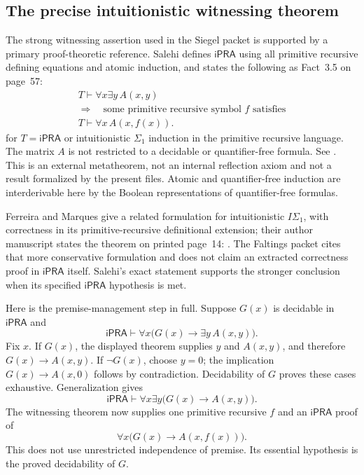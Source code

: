 \subsection{The precise intuitionistic witnessing theorem}

The strong witnessing assertion used in the Siegel packet is supported
by a primary proof-theoretic reference. Salehi defines $\mathsf{iPRA}$
using all primitive recursive defining equations and atomic induction,
and states the following as Fact~3.5 on page~57:
\[
 \begin{gathered}
 T\vdash\forall x\exists y\,A(x,y)\\
 \Longrightarrow\quad
 \text{some primitive recursive symbol }f\text{ satisfies}\\
 T\vdash\forall x\,A(x,f(x)).
 \end{gathered}
\]
for $T=\mathsf{iPRA}$ or intuitionistic $\Sigma_1$ induction in the
primitive recursive language. The matrix $A$ is not restricted to a
decidable or quantifier-free formula. See \cite{salehi}.
This is an external metatheorem, not an internal reflection axiom and
not a result formalized by the present files. Atomic and quantifier-free
induction are interderivable here by the Boolean representations of
quantifier-free formulas.

Ferreira and Marques give a related formulation for intuitionistic
$I\Sigma_1$, with correctness in its primitive-recursive definitional
extension; their author manuscript states the theorem on printed
page~14:
\cite{ferreira}.
The Faltings packet cites that more conservative formulation and does
not claim an extracted correctness proof in $\mathsf{iPRA}$ itself.
Salehi's exact statement supports the stronger conclusion when its
specified $\mathsf{iPRA}$ hypothesis is met.

Here is the premise-management step in full. Suppose $G(x)$ is decidable
in $\mathsf{iPRA}$ and
\[
 \mathsf{iPRA}\vdash
 \forall x\bigl(G(x)\longrightarrow\exists y\,A(x,y)\bigr).
\]
Fix $x$. If $G(x)$, the displayed theorem supplies $y$ and $A(x,y)$,
and therefore $G(x)\to A(x,y)$. If $\neg G(x)$, choose $y=0$;
the implication $G(x)\to A(x,0)$ follows by contradiction. Decidability
of $G$ proves these cases exhaustive. Generalization gives
\[
 \mathsf{iPRA}\vdash
 \forall x\exists y\bigl(G(x)\longrightarrow A(x,y)\bigr).
\]
The witnessing theorem now supplies one primitive recursive $f$ and
an $\mathsf{iPRA}$ proof of
\[
 \forall x\bigl(G(x)\longrightarrow A(x,f(x))\bigr).
\]
This does not use unrestricted independence of premise. Its essential
hypothesis is the proved decidability of $G$.

